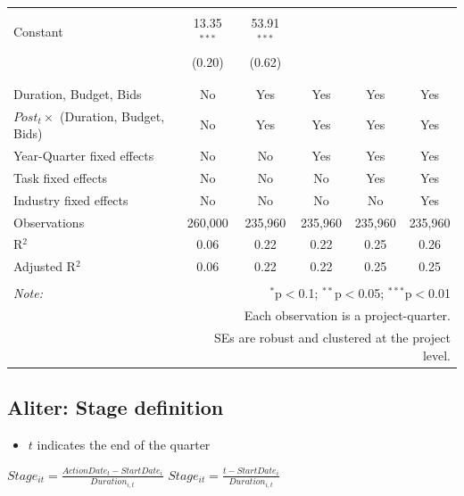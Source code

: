\documentclass[
]{article}
\providecommand{\tightlist}{%
  \setlength{\itemsep}{0pt}\setlength{\parskip}{0pt}}
\begin{document}
\begin{table}[H]
\begin{tabular}{@{\extracolsep{-2pt}}lccccc}
  & & & & & \\ 
 Constant & 13.35$^{***}$ & 53.91$^{***}$ &  &  &  \\ 
  & (0.20) & (0.62) &  &  &  \\ 
  & & & & & \\ 
\hline \\[-1.8ex] 
Duration, Budget, Bids & No & Yes & Yes & Yes & Yes \\ 
$Post_t \times $  (Duration, Budget, Bids) & No & Yes & Yes & Yes & Yes \\ 
Year-Quarter fixed effects & No & No & Yes & Yes & Yes \\ 
Task fixed effects & No & No & No & Yes & Yes \\ 
Industry fixed effects & No & No & No & No & Yes \\ 
Observations & 260,000 & 235,960 & 235,960 & 235,960 & 235,960 \\ 
R$^{2}$ & 0.06 & 0.22 & 0.22 & 0.25 & 0.26 \\ 
Adjusted R$^{2}$ & 0.06 & 0.22 & 0.22 & 0.25 & 0.25 \\ 
\hline 
\hline \\[-1.8ex] 
\textit{Note:}  & \multicolumn{5}{r}{$^{*}$p$<$0.1; $^{**}$p$<$0.05; $^{***}$p$<$0.01} \\ 
 & \multicolumn{5}{r}{Each observation is a project-quarter.} \\ 
 & \multicolumn{5}{r}{SEs are robust and clustered at the project level.} \\ 
\end{tabular} 
\end{table}

\hypertarget{aliter-stage-definition}{%
\subsection{Aliter: Stage definition}\label{aliter-stage-definition}}

\begin{itemize}
\tightlist
\item
  \(t\) indicates the end of the quarter
\end{itemize}

\(Stage_{it}=\frac{ActionDate_{t}-StartDate_i}{Duration_{i,t}}\)
\(Stage_{it}=\frac{t-StartDate_i}{Duration_{i,t}}\)
\end{document}
